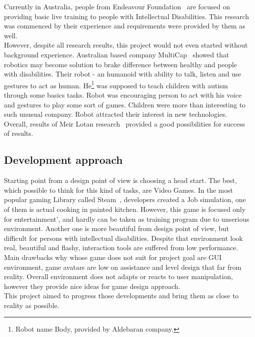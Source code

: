 \documentclass[18pt]{article}
\numberwithin{equation}{section} %
\numberwithin{figure}{section} %
\numberwithin{table}{section} %
\begin{document}
		Currently in Australia, people from Endeavour Foundation~\cite{Endeav} are focused on providing basic live training to people with Intellectual Disabilities. This research was commenced by their experience and requirements were provided by them as well. \\
		
		However, despite all research results, this project would not even started without background experience. Australian based company MultiCap~\cite{Multicap} showed that robotics may become solution to brake difference between healthy and people with disabilities. Their robot - an humanoid with ability to talk, listen and use gestures to act as human. He\footnote{Robot name Body, provided by Aldebaran company.} was supposed to teach children with autism through some basics tasks. Robot was encouraging person to act with his voice and gestures to play some sort of games. Children were more than interesting to such unusual company. Robot attracted their interest in new technologies. \\		
		Overall, results of Meir Lotan research~\cite{LOTAN2009229} provided a good possibilities for success of results.\\	
	
	\subsection{Development approach}
		Starting point from a design point of view is choosing a head start. The best, which possible to think for this kind of tasks, are Video Games. In the most popular gaming Library called Steam~\cite{Steam}, developers created a Job simulation, one of them is actual cooking in painted kitchen. However, this game is focused only for entertainment', and hardly can be taken as training program due to unserious environment. Another one is more beautiful from design point of view, but difficult for persons with intellectual disabilities. Despite that environment look real, beautiful and flashy, interaction tools are suffered from low performance. \\
		Main drawbacks why whose game does not suit for project goal are GUI environment, game avatars are low on assistance and level design that far from reality. Overall environment does not adapts or reacts to user manipulation, however they provide nice ideas for game design approach. \\
		This project aimed to progress those developments and bring them as close to reality as possible. \\
	
\end{document}
